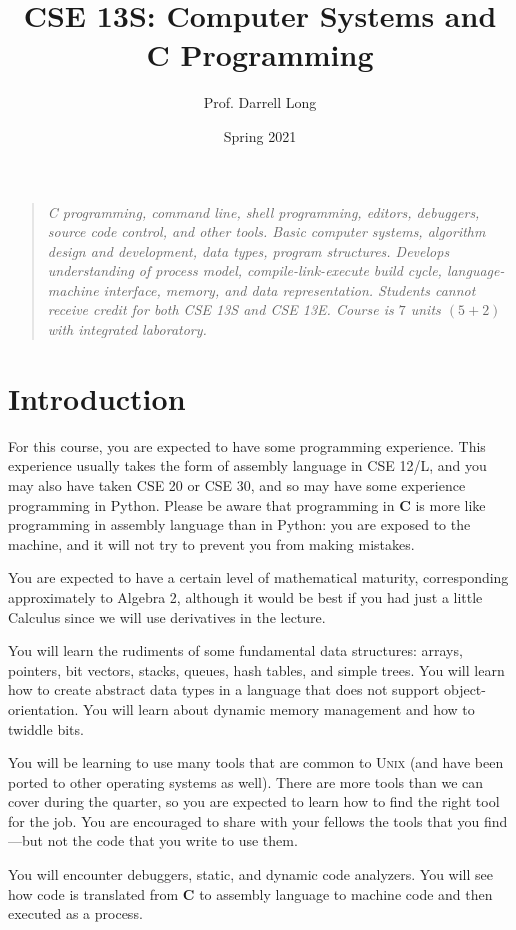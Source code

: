 \documentclass{article}
\title{CSE 13S: Computer Systems and \textbf{C} Programming}
\author{Prof.\xspace Darrell Long}
\date{Spring 2021}
\begin{document}
\maketitle
\begin{quotation}
\emph{
C programming, command line, shell programming, editors, debuggers,
source code control, and other tools. Basic computer systems,
algorithm design and development, data types, program structures.
Develops understanding of process model, compile-link-execute build
cycle, language-machine interface, memory, and data representation.
Students cannot receive credit for both CSE 13S and CSE 13E. Course
is $7$ units $(5 + 2)$ with integrated laboratory.
}
\end{quotation}

\section{Introduction}

For this course, you are expected to have some programming experience.
This experience usually takes the form of assembly language in CSE
12/L, and you may also have taken CSE 20 or CSE 30, and so may have
some experience programming in Python. Please be aware that programming
in \textbf{C} is more like programming in assembly language than
in Python: you are exposed to the machine, and it will not try to
prevent you from making mistakes.

You are expected to have a certain level of mathematical maturity,
corresponding approximately to Algebra 2, although it would be best
if you had just a little Calculus since we will use derivatives in
the lecture.

You will learn the rudiments of some fundamental data structures:
arrays, pointers, bit vectors, stacks, queues, hash tables, and
simple trees. You will learn how to create abstract data types in
a language that does not support object-orientation. You will learn
about dynamic memory management and how to twiddle bits.

You will be learning to use many tools that are common to \textsc{Unix}
(and have been ported to other operating systems as well). There
are more tools than we can cover during the quarter, so you are
expected to learn how to find the right tool for the job. You are
encouraged to share with your fellows the tools that you find---but
not the code that you write to use them.

You will encounter debuggers, static, and dynamic code analyzers.
You will see how code is translated from \textbf{C} to assembly
language to machine code and then executed as a process.
\end{document}

